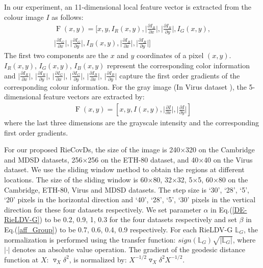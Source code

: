 \documentclass[review]{elsarticle}
\begin{document}
In our experiment, an 11-dimensional local feature vector is extracted from the colour image $I$ as follows:
\begin{equation}
\begin{split}
\label{color_Feature}
\mathop F(x,y) = [x,y,I_R(x,y),\lvert\frac{\partial{I_R}}{\partial{x}}\rvert,\lvert\frac{\partial{I_R}}{\partial{y}}\rvert,I_G(x,y),\\
 \lvert\frac{\partial{I_G}}{\partial{x}}\rvert,\lvert\frac{\partial{I_G}}{\partial{y}}\rvert,I_B(x,y),\lvert\frac{\partial{I_B}}{\partial{x}}\rvert,\lvert\frac{\partial{I_B}}{\partial{y}}\rvert]
\end{split}
\end{equation} 
The first two components are the $x$ and $y$ coordinates of a pixel $(x,y)$. $I_R(x,y)$, $I_G(x,y)$, $I_B(x,y)$ represent the corresponding color information and $\lvert\frac{\partial{I_R}}{\partial{x}}\rvert$, $\lvert\frac{\partial{I_R}}{\partial{y}}\rvert$, $\lvert\frac{\partial{I_G}}{\partial{x}}\rvert$, $\lvert\frac{\partial{I_G}}{\partial{y}}\rvert$, $\lvert\frac{\partial{I_B}}{\partial{x}}\rvert$, $\lvert\frac{\partial{I_B}}{\partial{y}}\rvert$ capture the first order gradients of the corresponding colour information. For the gray image (In Virus dataset \cite{kylberg2011virus}), the 5-dimensional feature vectors are extracted by:
\begin{equation}
\begin{split}
\label{gray_Feature}
\mathop F(x,y) = [x,y,I(x,y),\lvert\frac{\partial{I}}{\partial{x}}\rvert,\lvert\frac{\partial{I}}{\partial{y}}\rvert]
\end{split}
\end{equation} 
where the last three dimensions are the grayscale intensity and the corresponding first order gradients.

	For our proposed RieCovDs, the size of the image is 240$\times$320 on the Cambridge and MDSD datasets, 256$\times$256 on the ETH-80 dataset, and 40$\times$40 on the Virus dataset. We use the sliding window method to obtain the regions at different locations. The size of the sliding window is 60$\times$80, 32$\times$32, 5$\times$5, 60$\times$80 on the Cambridge, ETH-80, Virus and MDSD datasets. The step size is `30', `28', `5', `20' pixels in the horizontal direction and `40', `28', `5', `30' pixels in the vertical direction for these four datasets respectively. We set parameter $\alpha$ in {Eq.(\ref{DE-RieLDV-G})} to be 0.2, 0.9, 1, 0.3 for the four datasets respectively and set $\beta$ in {Eq.(\ref{aff_Group})} to be 0.7, 0.6, 0.4, 0.9 respectively. For each RieLDV-G $\mathbb{L}_G$, the normalization is performed using the transfer function: $sign(\mathbb{L}_G)\sqrt{|\mathbb{L}_G|}$, where $|\cdot|$ denotes an absolute value operation. The gradient of the geodesic distance function at $X$: $\triangledown_X\delta^2$, is normalized  by: $X^{-1/2}\triangledown_X\delta^2X^{-1/2}$.   
\end{document}
